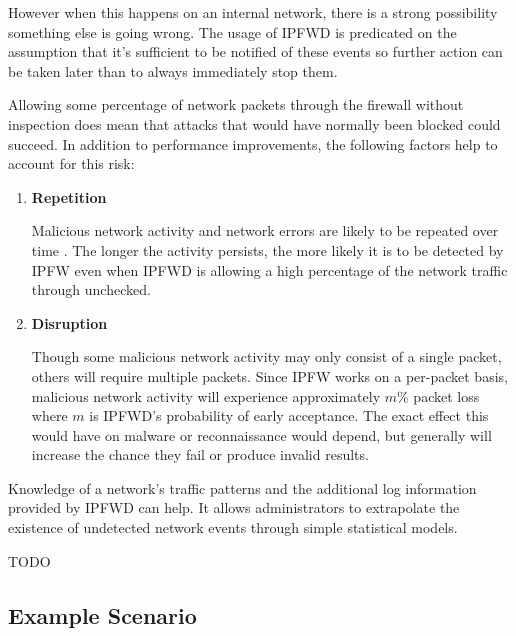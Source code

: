 \documentclass[journal]{IEEEtran}
\begin{document}
  However when this happens on an internal network, there is a strong
  possibility something else is going wrong. The usage of IPFWD is predicated
  on the assumption that it's sufficient to be notified of these events so
  further action can be taken later than to always immediately stop them.

  Allowing some percentage of network packets through the firewall without
  inspection does mean that attacks that would have normally been blocked could
  succeed. In addition to performance improvements, the following factors help
  to account for this risk:

  \begin{enumerate}

    \item \textbf{Repetition} 

      Malicious network activity and network errors are likely to be repeated
      over time \cite{TODO}. The longer the activity persists, the more likely
      it is to be detected by IPFW even when IPFWD is allowing a high
      percentage of the network traffic through unchecked.

    \item \textbf{Disruption} 

      Though some malicious network activity may only consist of a single
      packet, others will require multiple packets. Since IPFW works on a
      per-packet basis, malicious network activity will experience
      approximately $m\%$ packet loss where $m$ is IPFWD's probability of early
      acceptance. The exact effect this would have on malware or reconnaissance
      would depend, but generally will increase the chance they fail or produce
      invalid results.

  \end{enumerate}

  Knowledge of a network's traffic patterns and the additional log information
  provided by IPFWD can help. It allows administrators to extrapolate the
  existence of undetected network events through simple statistical models.

  TODO

  \subsection{Example Scenario} 
\end{document}
